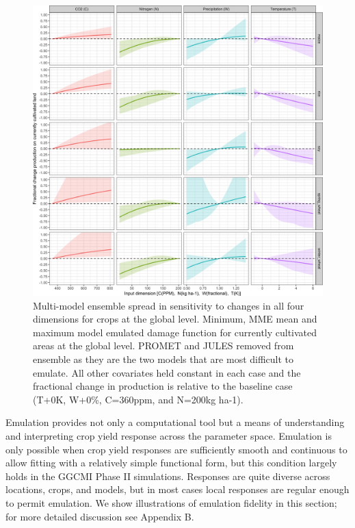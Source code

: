\documentclass[gmd, manuscript]{copernicus} %
\begin{document}
\begin{figure}[ht]
	\centering
    \includegraphics[width=15cm]{figures/em_CTWN_all_crops.png}
	\caption{Multi-model ensemble spread in sensitivity to changes in all four dimensions for crops at the global level. Minimum, MME mean and maximum model emulated damage function for currently cultivated areas at the global level. 
	PROMET and JULES removed from ensemble as they are the two models that are most difficult to emulate. 
	All other covariates held constant in each case and the fractional change in production is relative to the baseline case (T+0K, W+0\%, C=360ppm, and N=200kg ha-1).}
	\label{fig:all_dims}
\end{figure}

Emulation provides not only a computational tool but a means of understanding and interpreting crop yield response across the parameter space. 
Emulation is only possible  when crop yield responses are sufficiently smooth and continuous to allow fitting with a relatively simple functional form, but this condition largely holds in the GGCMI Phase II simulations. 
Responses are quite diverse across locations, crops, and models, but in most cases local responses are regular enough to permit emulation. 
We show illustrations of emulation fidelity in this section; for more detailed discussion see Appendix B.
\end{document}
